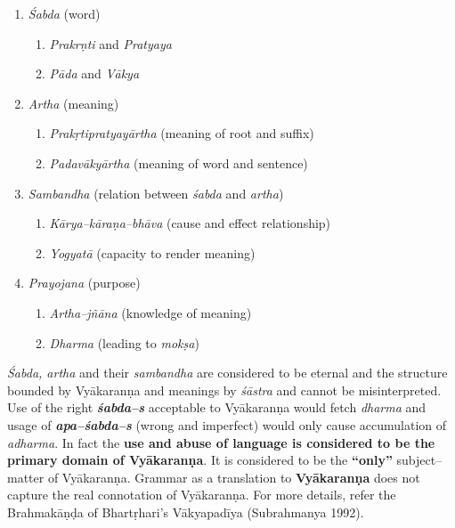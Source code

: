 \begin{enumerate}
\itemsep=0pt
\item \textit{Śabda} (word)
 
\begin{enumerate}
\itemsep=0pt
\item \textit{Prakrṇti} and \textit{Pratyaya}

 \item \textit{Pāda} and \textit{Vākya}
\end{enumerate}

 \item \textit{Artha} (meaning)
 
\begin{enumerate}
\itemsep=0pt
\item \textit{Prakṛtipratyayārtha} (meaning of root and suffix)

 \item \textit{Padavākyārtha} (meaning of word and sentence) 
\end{enumerate}

 \item \textit{Sambandha} (relation between \textit{śabda} and \textit{artha})
 
\begin{enumerate}
\itemsep=0pt
\item \textit{Kārya–kāraṇa–bhāva} (cause and effect relationship)

 \item \textit{Yogyatā} (capacity to render meaning)
\end{enumerate}

 \item \textit{Prayojana} (purpose)
 
\begin{enumerate}
\itemsep=0pt
\item \textit{Artha–jñāna} (knowledge of meaning)

 \item \textit{Dharma} (leading to \textit{mokṣa})
\end{enumerate}

\end{enumerate}

\textit{Śabda, artha} and their \textit{sambandha} are considered to be eternal and the structure bounded by Vyākaranṇa and meanings by \textit{śāstra} and cannot be misinterpreted. Use of the right \textbf{\textit{śabda–s}} acceptable to Vyākaranṇa would fetch \textit{dharma} and usage of \textbf{\textit{apa–śabda–s}} (wrong and imperfect) would only cause accumulation of \textit{adharma}. In fact the \textbf{use and abuse of language is considered to be the primary domain of Vyākaranṇa}. It is considered to be the \textbf{“only”} subject–matter of Vyākaranṇa. Grammar as a translation to \textbf{Vyākaranṇa} does not capture the real connotation of Vyākaranṇa. For more details, refer the Brahmakāṇḍa of Bhartṛhari’s Vākyapadīya (Subrahmanya 1992).

